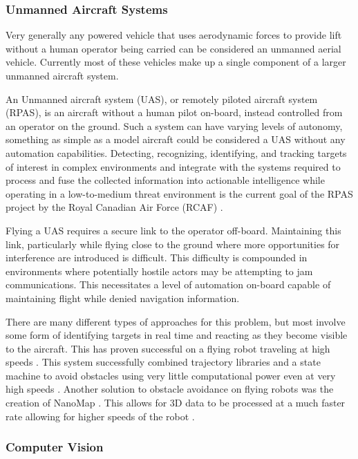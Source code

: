\documentclass{article}
\begin{document}
		\subsubsection{Unmanned Aircraft Systems}
		
		Very generally any powered vehicle that uses aerodynamic forces to provide lift without a human operator being carried can be considered an unmanned aerial vehicle. Currently most of these vehicles make up a single component of a larger unmanned aircraft system. 
		
		An Unmanned aircraft system (UAS), or remotely piloted aircraft system (RPAS), is an aircraft without a human pilot on-board, instead controlled from an operator on the ground. Such a system can have varying levels of autonomy, something as simple as a model aircraft could be considered a UAS without any automation capabilities. Detecting, recognizing, identifying, and tracking targets of interest in complex environments and integrate with the systems required to process and fuse the collected information into actionable intelligence while operating in a low-to-medium threat environment is the current goal of the RPAS project by the Royal Canadian Air Force (RCAF) \cite{RPAS}. 
		
		Flying a UAS requires a secure link to the operator off-board. Maintaining this link, particularly while flying close to the ground where more opportunities for interference are introduced is difficult. This difficulty is compounded in environments where potentially hostile actors may be attempting to jam communications. This necessitates a level of automation on-board capable of maintaining flight while denied navigation information.
		
		There are many different types of approaches for this problem, but most involve some form of identifying targets in real time and reacting as they become visible to the aircraft. This has proven successful on a flying robot traveling at high speeds \cite{barry2015pushbroom}. This system successfully combined trajectory libraries and a state machine to avoid obstacles using very little computational power even at very high speeds \cite{barry2018high}. Another solution to obstacle avoidance on flying robots was the creation of NanoMap \cite{2018nanomap}. This allows for 3D data to be processed at a much faster rate allowing for higher speeds of the robot \cite{2018nanomap}.
		
		\subsubsection{Computer Vision}
		
\end{document}
